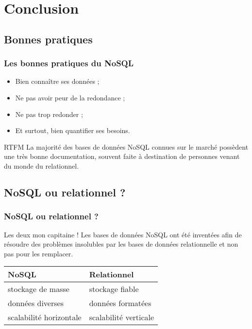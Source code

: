 \section{Conclusion}

	\subsection{Bonnes pratiques}
		\begin{frame}
			\frametitle{Les bonnes pratiques du NoSQL}

			\begin{itemize}
				\item Bien connaître ses données ;
				\item Ne pas avoir peur de la redondance ;
				\item Ne pas trop redonder ;
				\item Et surtout, bien quantifier ses besoins.
			\end{itemize}


			\begin{block}{RTFM}
				La majorité des bases de données NoSQL connues sur le marché possèdent une très bonne documentation, souvent faite à destination de personnes venant du monde du relationnel.
			\end{block}
		\end{frame}

	\subsection{NoSQL ou relationnel ?}
		\begin{frame}
			\frametitle{NoSQL ou relationnel ?}

			\begin{alertblock}{Les deux mon capitaine !}
				Les bases de données NoSQL ont été inventées afin de résoudre des problèmes insolubles par les bases de données relationnelle et non pas pour les remplacer.
			\end{alertblock}

			\vspace{20px}

			\begin{tabular}{|l|l|}
				\hline
				\textbf{NoSQL} & \textbf{Relationnel} \\ \hline\hline
				stockage de masse & stockage fiable \\ \hline
				données diverses & données formatées \\ \hline
				scalabilité horizontale & scalabilité verticale \\ \hline
			\end{tabular}
		\end{frame}

